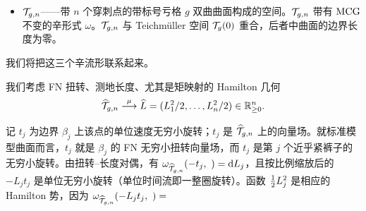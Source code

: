 \begin{itemize}[leftmargin=1.6em,itemsep=2pt,topsep=2pt]
\item $\mathcal{T}_{g,n}$——带 $n$ 个穿刺点的带标号亏格 $g$ 双曲曲面构成的空间。$\mathcal{T}_{g,n}$ 带有 $\mathrm{MCG}$ 不变的辛形式 $\omega$。$\mathcal{T}_{g,n}$ 与 Teichmüller 空间 $\mathcal{T}_g(0)$ 重合，后者中曲面的边界长度为零。
\end{itemize}

我们将把这三个辛流形联系起来。


我们考虑 FN 扭转、测地长度、尤其是矩映射的 Hamilton 几何
\[
\widehat{\mathcal{T}}_{g,n}\overset{\mu}{\longrightarrow}\widehat{L}=(L_1^2/2,\dots,L_n^2/2)\in\mathbb{R}^n_{\ge 0}.
\]

记 $t_j$ 为边界 $\beta_j$ 上该点的单位速度无穷小旋转；$t_j$ 是 $\widehat{\mathcal{T}}_{g,n}$ 上的向量场。就标准模型曲面而言，$t_j$ 就是 $\beta_j$ 的 FN 无穷小扭转向量场，而 $t_j$ 是第 $j$ 个近乎紧裤子的无穷小旋转。由扭转--长度对偶，有 $\omega_{\widehat{\mathcal{T}}_{g,n}}(-t_j,\ )=\mathrm{d} L_j$，且按比例缩放后的 $-L_jt_j$ 是单位无穷小旋转（单位时间流即一整圈旋转）。函数 $\tfrac{1}{2} L_j^2$ 是相应的 Hamilton 势，因为
$\omega_{\what{\cT}_{g,n}}(-L_jt_j,\ )=$
